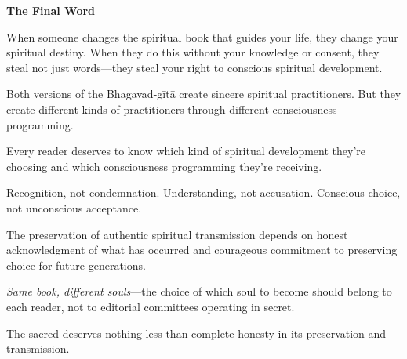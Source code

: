 \documentclass[11pt,twoside]{book}
\begin{document}
\textbf{The Final Word}

When someone changes the spiritual book that guides your life, they change your spiritual destiny. When they do this without your knowledge or consent, they steal not just words—they steal your right to conscious spiritual development.

Both versions of the Bhagavad-gītā create sincere spiritual practitioners. But they create different kinds of practitioners through different consciousness programming.

Every reader deserves to know which kind of spiritual development they're choosing and which consciousness programming they're receiving.

Recognition, not condemnation. Understanding, not accusation. Conscious choice, not unconscious acceptance.

The preservation of authentic spiritual transmission depends on honest acknowledgment of what has occurred and courageous commitment to preserving choice for future generations.

\textit{Same book, different souls}—the choice of which soul to become should belong to each reader, not to editorial committees operating in secret.

The sacred deserves nothing less than complete honesty in its preservation and transmission.
\end{document}
